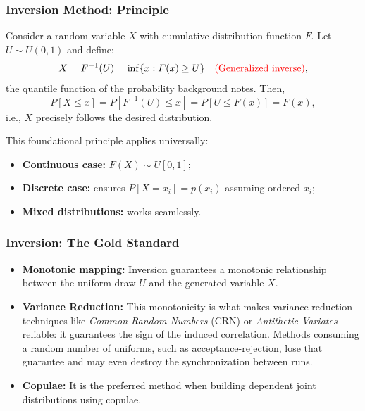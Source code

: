 \documentclass[aspectratio=169]{beamer}
\begin{document}
	\begin{frame}
		\frametitle{Inversion Method: Principle}

		Consider a random variable $X$ with cumulative distribution function $F$.
		Let $U \sim U (0, 1)$ and define:
		\[
		X = F^{-1}(U) = \inf \lbrace x : F (x)  \geq U \rbrace \quad \textrm{\textcolor{red}{(Generalized inverse)}},
		\]
		the quantile function of the probability background notes.
		Then,
		\[
		P [X \leq x] = P [F^{-1}(U) \leq x] = P [U \leq F (x)] = F (x),
		\]
		i.e., $X$ precisely follows the desired distribution.
		
		\vspace{0.4cm}
		This foundational principle applies universally:
		\begin{itemize}
			\item \textbf{Continuous case:} $F(X) \sim U[0,1]$;
			\item \textbf{Discrete case:} ensures $P[X = x_i] = p(x_i)$ assuming ordered $x_i$;
			\item \textbf{Mixed distributions:} works seamlessly.
		\end{itemize}
	\end{frame}
	
	\begin{frame}
		\frametitle{Inversion: The Gold Standard}

		\begin{itemize}
		    \item \textbf{Monotonic mapping:} Inversion guarantees a monotonic relationship between the uniform draw $U$ and the generated variable $X$.
		    \vspace{0.3cm}
		    \item \textbf{Variance Reduction:} This monotonicity is what makes variance reduction techniques like \textit{Common Random Numbers} (CRN) or \textit{Antithetic Variates} reliable: it guarantees the sign of the induced correlation. Methods consuming a random number of uniforms, such as acceptance-rejection, lose that guarantee and may even destroy the synchronization between runs.
		    \vspace{0.3cm}
		    \item \textbf{Copulae:} It is the preferred method when building dependent joint distributions using copulae.
		\end{itemize}

	\end{frame}
	
\end{document}
